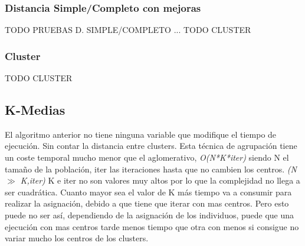 		\subsubsection{Distancia Simple/Completo con mejoras}	
		
		\color{blue} TODO PRUEBAS D. SIMPLE/COMPLETO ...
		TODO CLUSTER
		\color{black}
		\subsubsection{Cluster}	
		
		TODO CLUSTER
		
		\color{black}



		\newpage

	\subsection{K-Medias}	

	El algoritmo anterior no tiene ninguna variable que modifique el tiempo de ejecución. Sin contar la distancia entre clusters. Esta técnica de agrupación tiene un coste temporal mucho menor que el aglomerativo, \textit{O(N*K*iter)} siendo N el tamaño de la población, iter las iteraciones  hasta que no cambien los centros. \textit{(N $\gg$ K,iter)} K e iter no son valores muy altos por lo que la complejidad no llega a ser cuadrática. Cuanto mayor sea el valor de K más tiempo va a consumir para realizar la asignación, debido a que tiene que iterar con mas centros. Pero esto puede no ser así, dependiendo de la asignación de los individuos, puede que una ejecución con mas centros tarde menos tiempo que otra con menos si consigue no variar mucho los centros de los clusters.
	
